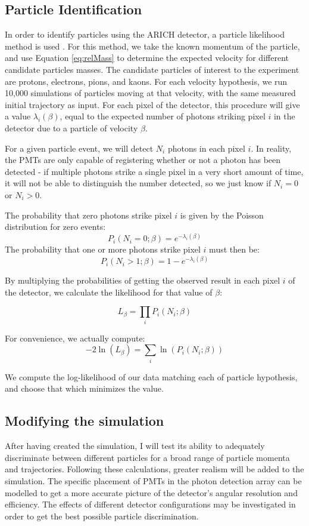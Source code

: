 \subsection{Particle Identification}
\label{sec:particleIdentification}
In order to identify particles using the ARICH detector, a particle likelihood method is used \cite{richImpact, belleArich}. For this method, we take the known momentum of the particle, and use Equation \ref{eq:relMass} to determine the expected velocity for different candidate particles masses. The candidate particles of interest to the experiment are protons, electrons, pions, and kaons. For each velocity hypothesis, we run 10,000 simulations of particles moving at that velocity, with the same measured initial trajectory as input. For each pixel of the detector, this procedure will give a value $\lambda_i(\beta)$, equal to the expected number of photons striking pixel $i$ in the detector due to a particle of velocity $\beta$. 

For a given particle event, we will detect $N_i$ photons in each pixel $i$. In reality, the PMTs are only capable of registering whether or not a photon has been detected - if multiple photons strike a single pixel in a very short amount of time, it will not be able to distinguish the number detected, so we just know if $N_i = 0$ or $N_i > 0$.

The probability that zero photons strike pixel $i$ is given by the Poisson distribution for zero events:
$$ P_i(N_i=0; \beta) = e^{-\lambda_i(\beta)} $$
 The probability that one or more photons strike pixel $i$ must then be:
$$ P_i(N_i>1; \beta) = 1 - e^{-\lambda_i(\beta)} $$

By multiplying the probabilities of getting the observed result in each pixel $i$ of the detector, we calculate the likelihood for that value of $\beta$:

$$L_\beta = \prod_{i}P_i(N_i; \beta)$$

For convenience, we actually compute:
\begin{equation}
    \label{eq:loglikelihood}
    -2\ln(L_\beta) = \sum_i \ln(P_i(N_i; \beta))
\end{equation}


We compute the log-likelihood of our data matching each of particle hypothesis, and choose that which minimizes the value.

\subsection{Modifying the simulation}
After having created the simulation, I will test its ability to adequately discriminate between different particles for a broad range of particle momenta and trajectories. Following these calculations, greater realism will be added to the simulation. The specific placement of PMTs in the photon detection array can be modelled to get a more accurate picture of the detector's angular resolution and efficiency. The effects of different detector configurations may be investigated in order to get the best possible particle discrimination. 

